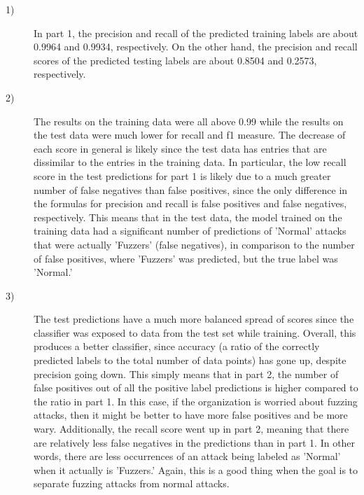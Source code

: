\documentclass[11pt]{article}
\begin{document}
\begin{description}
  \item[1)] In part 1, the precision and recall of the predicted training labels are about 0.9964 and 0.9934, respectively. On the other hand, the precision
    and recall scores of the predicted testing labels are about 0.8504 and 0.2573, respectively.
  \item[2)] The results on the training data were all above 0.99 while the results on the test data were much lower for recall and f1 measure. The decrease
    of each score in general is likely since the test data has entries that are dissimilar to the entries in the training data. In particular, the low recall
    score in the test predictions for part 1 is likely due to a much greater number of false negatives than false positives, since the only difference in the 
    formulas for precision and recall is false positives and false negatives, respectively. This means that in the test data, the model trained on the training
    data had a significant number of predictions of 'Normal' attacks that were actually 'Fuzzers' (false negatives), in comparison to the number of false
    positives, where 'Fuzzers' was predicted, but the true label was 'Normal.'
  \item[3)] The test predictions have a much more balanced spread of scores since the classifier was exposed to data from the test set while training. Overall,
    this produces a better classifier, since accuracy (a ratio of the correctly predicted labels to the total number of data points) has gone up, despite
    precision going down. This simply means that in part 2, the number of false positives out of all the positive label predictions is higher compared to the
    ratio in part 1. In this case, if the organization is worried about fuzzing attacks, then it might be better to have more false positives and be more wary.
    Additionally, the recall score went up in part 2, meaning that there are relatively less false negatives in the predictions than in part 1. In other words,
    there are less occurrences of an attack being labeled as 'Normal' when it actually is 'Fuzzers.' Again, this is a good thing when the goal is to separate
    fuzzing attacks from normal attacks.
\end{description}
\end{document}
